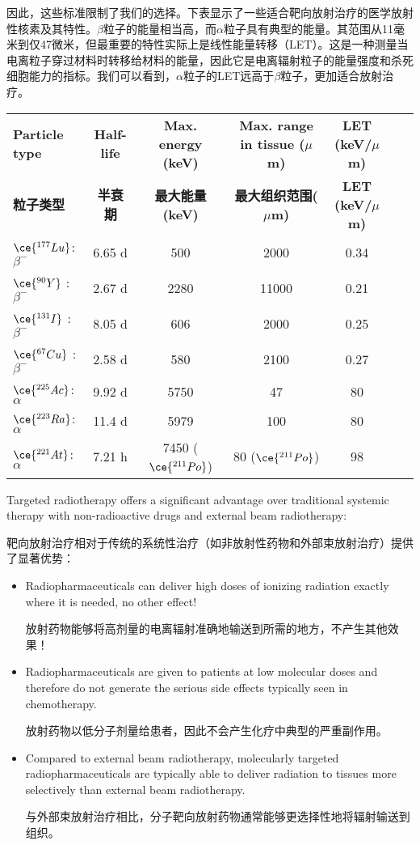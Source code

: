 \documentclass[dvipsnames, svgnames,a4paper,11pt]{article}
\begin{document}
因此，这些标准限制了我们的选择。下表显示了一些适合靶向放射治疗的医学放射性核素及其特性。$\beta$粒子的能量相当高，而$\alpha$粒子具有典型的能量。其范围从11毫米到仅47微米，但最重要的特性实际上是线性能量转移（LET）。这是一种测量当电离粒子穿过材料时转移给材料的能量，因此它是电离辐射粒子的能量强度和杀死细胞能力的指标。我们可以看到，$\alpha$粒子的LET远高于$\beta$粒子，更加适合放射治疗。

\begin{table*}[htbp]
    \centering
    \begin{tabular}{lcccccc}
    \toprule
    \textbf{Particle type} & \textbf{Half-life} & \textbf{Max. energy (keV)} & \textbf{Max. range in tissue ($\mu$m)} & \textbf{LET (keV/$\mu$m)} \\
    \textbf{粒子类型} & \textbf{半衰期} & \textbf{最大能量(keV)} & \textbf{最大组织范围($\mu$m)} & \textbf{LET (keV/$\mu$m)} \\
    \midrule
    \(\ce{^{177}Lu}\): \(\beta^-\) & 6.65 d & 500 & 2000 & 0.34 \\
    \(\ce{^{90}Y}\)  : \(\beta^-\) & 2.67 d & 2280 & 11000 & 0.21 \\
    \(\ce{^{131}I}\) : \(\beta^-\) & 8.05 d & 606 & 2000 & 0.25 \\
    \(\ce{^{67}Cu}\) : \(\beta^-\) & 2.58 d & 580 & 2100 & 0.27 \\
    \(\ce{^{225}Ac}\):\(\alpha\) & 9.92 d & 5750 & 47 & 80 \\
    \(\ce{^{223}Ra}\):\(\alpha\) & 11.4 d & 5979 & 100 & 80 \\
    \(\ce{^{221}At}\):\(\alpha\) & 7.21 h & 7450 (\(\ce{^{211}Po}\)) & 80 (\(\ce{^{211}Po}\)) & 98 \\
    \bottomrule
    \end{tabular}
    \end{table*}

Targeted radiotherapy offers a significant advantage over traditional systemic therapy with non-radioactive drugs and external beam radiotherapy:

靶向放射治疗相对于传统的系统性治疗（如非放射性药物和外部束放射治疗）提供了显著优势：
\begin{itemize}
      \item Radiopharmaceuticals can deliver high doses of ionizing radiation exactly where it is needed, no other effect!

            放射药物能够将高剂量的电离辐射准确地输送到所需的地方，不产生其他效果！

      \item Radiopharmaceuticals are given to patients at low molecular doses and therefore do not generate the serious side effects typically seen in chemotherapy.

            放射药物以低分子剂量给患者，因此不会产生化疗中典型的严重副作用。

      \item Compared to external beam radiotherapy,
            molecularly targeted radiopharmaceuticals are typically able to deliver radiation to tissues more selectively than external beam radiotherapy.

            与外部束放射治疗相比，分子靶向放射药物通常能够更选择性地将辐射输送到组织。
\end{itemize}
\end{document}
